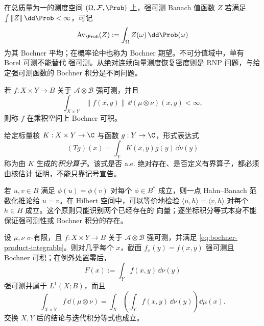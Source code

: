 \begin{example}\label{ex:3-4-3-3}
在总质量为一的测度空间 $(\Omega,\mathcal F,\Prob)$ 上，强可测 Banach 值函数 $Z$ 若满足
$\int\|Z\|\,\dd\Prob<\infty$，可记
\[
  \operatorname{Av}_{\Prob}(Z):=\int_\Omega Z(\omega)\,\dd\Prob(\omega)
\]
为其 Bochner 平均；在概率论中也称为 Bochner 期望。不可分值域中，单有 Borel 可测不能替代
强可测。从绝对连续向量测度恢复密度则是 RNP 问题，与给定强可测函数的 Bochner 积分是不同问题。
\end{example}

\begin{definition}\label{def:3-4-3-1}
若 $f:X\times Y\to B$ 关于 $\mathcal A\otimes\mathcal B$ 强可测，并且
\[
 \int_{X\times Y}\|f(x,y)\|\,\dd(\mu\otimes\nu)(x,y)<\infty,
 \tag{3.4.15}\label{eq:bochner-product-integrable}
\]
则称 $f$ 在乘积空间上 Bochner 可积。
\end{definition}

\begin{definition}[积分算子]\label{def:3-4-3-2}
给定标量核 $K:X\times Y\to\C$ 与函数 $g:Y\to\C$，形式表达式
\[
 (Tg)(x)=\int_YK(x,y)g(y)\,\dd\nu(y)
 \tag{3.4.16}\label{eq:integral-operator-definition}
\]
称为由 $K$ 生成的\emph{积分算子}。该式是否 a.e. 绝对存在、是否定义有界算子，都必须由核估计
证明，不能只靠记号宣告。
\end{definition}

\begin{remark}[弱等式的识别原则]\label{def:3-4-3-3}
若 $u,v\in B$ 满足 $\phi(u)=\phi(v)$ 对每个 $\phi\in B^*$ 成立，则一点 Hahn--Banach
范数化推论给 $u=v$。在 Hilbert 空间中，可以等价地检验
$\langle u,h\rangle=\langle v,h\rangle$ 对每个 $h\in H$ 成立。这个原则只能识别两个已经存在的
向量；逐坐标积分等式本身不能保证强可测性或 Bochner 积分的存在。
\end{remark}

\begin{theorem}\label{theorem:3-4-3-1}
设 $\mu,\nu$ $\sigma$-有限，且 $f:X\times Y\to B$ 关于
$\mathcal A\otimes\mathcal B$ 强可测，并满足
\eqref{eq:bochner-product-integrable}。则对几乎每个 $x$，截面
$f_x(y)=f(x,y)$ 强可测且 Bochner 可积；在例外处置零后，
\[
 F(x):=\int_Yf(x,y)\,\dd\nu(y)
\]
强可测并属于 $L^1(X;B)$，而且
\[
 \int_{X\times Y}f\,\dd(\mu\otimes\nu)
 =\int_X\left(\int_Yf(x,y)\,\dd\nu(y)\right)\dd\mu(x).
 \tag{3.4.17}\label{eq:bochner-fubini}
\]
交换 $X,Y$ 后的结论与迭代积分等式也成立。
\end{theorem}

